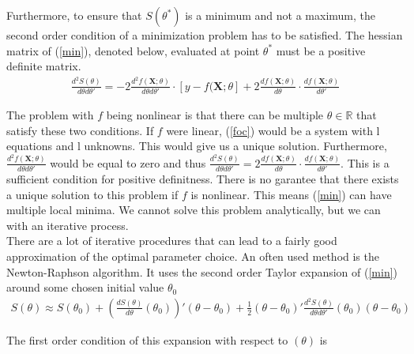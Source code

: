 \documentclass{article}
\begin{document}
Furthermore, to ensure that $S(\theta^*)$ is a minimum and not a maximum, the second order condition of a minimization problem has to be satisfied. The hessian matrix of (\ref{min}), denoted below, evaluated at point $\theta^*$ must be a positive definite matrix.
\begin{eqnarray}   
\frac{d^2S(\theta)}{d\theta d\theta'} =  -2 \frac{d^2f(\mathbf{X};\theta)}{d\theta d\theta'} \cdot [y - f(\mathbf{X};\theta] + 2 \frac{df(\mathbf{X};\theta)}{d\theta} \cdot \frac{df(\mathbf{X};\theta)}{d\theta'} 
 \label{soc}
\end{eqnarray}

The problem with $f$ being nonlinear is that there can be multiple $\theta \in \mathbb{R}$ that satisfy these two conditions. If $f$ were linear, (\ref{foc}) would be a system with l equations and l unknowns. This would give us a unique solution. Furthermore, $\frac{d^2f(\mathbf{X};\theta)}{d\theta d\theta'} $ would be equal to zero and thus $\frac{d^2S(\theta)}{d\theta d\theta'} =  2 \frac{df(\mathbf{X};\theta)}{d\theta} \cdot \frac{df(\mathbf{X};\theta)}{d\theta'} $. This is a sufficient condition for positive definitness.  There is no garantee that there exists a unique solution to this problem if $f$ is nonlinear. This means (\ref{min}) can have multiple local minima. We cannot solve this problem analytically, but we can with an iterative process.
\\
There are a lot of iterative procedures that can lead to a fairly good approximation of the optimal parameter choice. An often used method is the Newton-Raphson algorithm. It uses the second order Taylor expansion of (\ref{min}) around some chosen initial value $\theta_0$
\begin{eqnarray}
S(\theta) \approx S(\theta_0) + (\frac{dS(\theta)}{d\theta}(\theta_0))' (\theta - \theta_0) + \frac{1}{2} (\theta - \theta_0)'\frac{d^2 S(\theta)}{d\theta d\theta'}(\theta_0)(\theta - \theta_0) \label{taylor}
\end{eqnarray}

The first order condition of this expansion with respect to $(\theta)$ is
\end{document}

